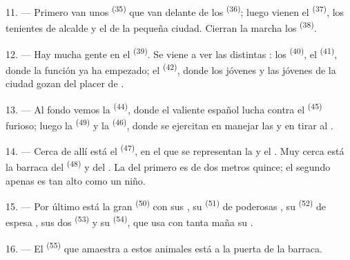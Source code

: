 11. --- Primero van unos  \textsuperscript{(35)} que van
delante de los  \textsuperscript{(36)}; luego vienen el
 \textsuperscript{(37)}, los tenientes de alcalde y el
 de la pequeña ciudad. Cierran la marcha los
 \textsuperscript{(38)}.

\VUsaut{5.0mm}
\VUsaut{3.6mm}

12. --- Hay mucha gente en el  \textsuperscript{(39)}. Se
viene a ver las distintas : los  \textsuperscript{(40)}, el  \textsuperscript{(41)}, donde la función
ya ha empezado; el  \textsuperscript{(42)}, donde los jóvenes y
las jóvenes de la ciudad gozan del placer de .

13. --- Al fondo vemos la  \textsuperscript{(44)}, donde el
valiente  español lucha contra el 
\textsuperscript{(45)} furioso; luego la  \textsuperscript{(49)} y la
 \textsuperscript{(46)}, donde se ejercitan en manejar las
 y en tirar al .

14. --- Cerca de allí está el  \textsuperscript{(47)}, en
el que se representan la  y el . Muy cerca está
la barraca del  \textsuperscript{(48)} y del . La
 del primero es de dos metros quince; el segundo apenas es
tan alto como un niño.

15. --- Por último está la gran 
\textsuperscript{(50)} con sus , su 
\textsuperscript{(51)} de poderosas , su  \textsuperscript{(52)}
de espesa , sus dos  \textsuperscript{(53)} y su
 \textsuperscript{(54)}, que usa con tanta maña su .

16. --- El  \textsuperscript{(55)} que amaestra a estos animales está
a la puerta de la barraca.
\VUsaut{6.0mm}
\VUfilet{22mm}
